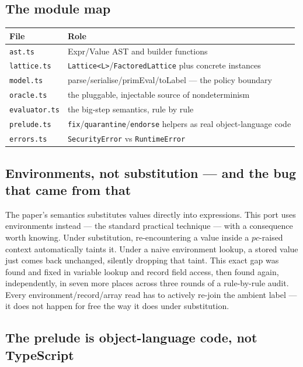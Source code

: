 \documentclass[11pt, a4paper]{article}
\begin{document}
\subsection{The module map}

\begin{center}
\begin{tabular}{@{}ll@{}}
\toprule
File & Role \\
\midrule
\texttt{ast.ts} & Expr/Value AST and builder functions \\
\texttt{lattice.ts} & \texttt{Lattice<L>}/\texttt{FactoredLattice} plus concrete instances \\
\texttt{model.ts} & parse/serialise/primEval/toLabel --- the policy boundary \\
\texttt{oracle.ts} & the pluggable, injectable source of nondeterminism \\
\texttt{evaluator.ts} & the big-step semantics, rule by rule \\
\texttt{prelude.ts} & \texttt{fix}/\texttt{quarantine}/\texttt{endorse} helpers as real object-language code \\
\texttt{errors.ts} & \texttt{SecurityError} vs \texttt{RuntimeError} \\
\bottomrule
\end{tabular}
\end{center}

\subsection{Environments, not substitution --- and the bug that came from that}
\label{sec:env-not-subst}

The paper's semantics substitutes values directly into expressions. This
port uses environments instead --- the standard practical technique ---
with a consequence worth knowing. Under substitution, re-encountering a
value inside a $pc$-raised context automatically taints it. Under a naive
environment lookup, a stored value just comes back unchanged, silently
dropping that taint. This exact gap was found and fixed in variable
lookup and record field access, then found again, independently, in seven
more places across three rounds of a rule-by-rule audit. Every
environment/record/array read has to actively re-join the ambient label
--- it does not happen for free the way it does under substitution.

\subsection{The prelude is object-language code, not TypeScript}
\end{document}
